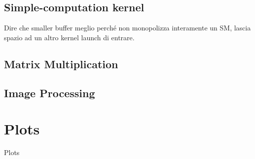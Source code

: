 \subsection{Simple-computation kernel}
Dire che smaller buffer meglio perché non monopolizza interamente un SM, lascia spazio ad un altro kernel launch di entrare.

\subsection{Matrix Multiplication}

\subsection{Image Processing}


\section{Plots}
Plots